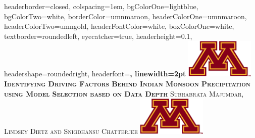 \documentclass[landscape,a0paper,fontscale=0.3]{baposter} %
\begin{document}
\begin{poster}
{
headerborder=closed, %
colspacing=1em, %
bgColorOne=lightblue, %
bgColorTwo=white, %
borderColor=umnmaroon, %
headerColorOne=umnmaroon, %
headerColorTwo=umngold, %
headerFontColor=white, %
boxColorOne=white, %
textborder=roundedleft, %
eyecatcher=true, %
headerheight=0.1\textheight, %
headershape=roundedright, %
headerfont=\Large\bf\textsc, %
linewidth=2pt %
}
%
{\includegraphics[height=5em]{umnlogo1}} %
{\huge{\bf\textsc{Identifying Driving Factors Behind Indian Monsoon Precipitation using Model Selection based on Data Depth}}\vspace{0.5em}} %
{\textsc{ Subhabrata Majumdar, Lindsey Dietz and Snigdhansu Chatterjee }}
{\includegraphics[height=5em]{umnlogo1}} %



\end{poster}
\end{document}
